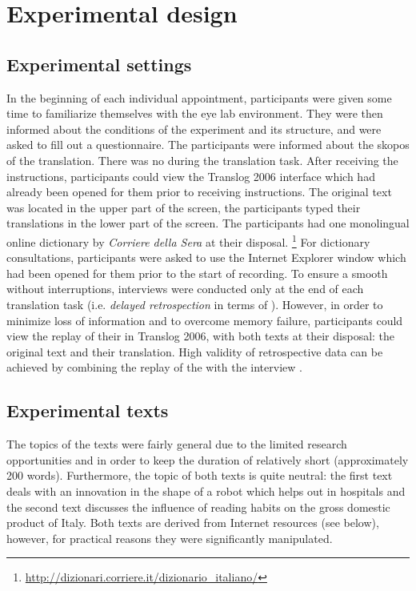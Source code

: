 \documentclass[output=paper]{langsci/langscibook.cls}
\begin{document}
\section{Experimental design}
\subsection{Experimental settings}

In the beginning of each individual appointment, participants were given some time to familiarize themselves with the eye lab environment. They were then informed about the conditions of the experiment and its structure, and were asked to fill out a questionnaire. The participants were informed about the skopos of the translation. There was no  during the translation task. After receiving the instructions, participants could view the Translog 2006 interface which had already been opened for them prior to receiving instructions. The original text was located in the upper part of the screen, the participants typed their translations in the lower part of the screen. The participants had one monolingual online dictionary by \textit{Corriere della Sera} at their disposal. \footnote{\url{http://dizionari.corriere.it/dizionario\_italiano/}} For dictionary consultations, participants were asked to use the Internet Explorer window which had been opened for them prior to the start of recording. To ensure a smooth  without interruptions, interviews were conducted only at the end of each translation task (i.e. \textit{delayed retrospection} in terms of \citealt{Cohen1981}). However, in order to minimize loss of information and to overcome memory failure, participants could view the replay of their  in Translog 2006, with both texts at their disposal: the original text and their translation. High validity of retrospective data can be achieved by combining the replay of the  with the interview \citep[35]{Gopferich2008}. 

\subsection{Experimental texts}

The topics of the texts were fairly general due to the limited research opportunities and in order to keep the duration of  relatively short (approximately 200 words). Furthermore, the topic of both texts is quite neutral: the first text deals with an innovation in the shape of a robot which helps out in hospitals and the second text discusses the influence of reading habits on the gross domestic product of Italy. Both texts are derived from Internet resources (see below), however, for practical reasons they were significantly manipulated. 
\end{document}
